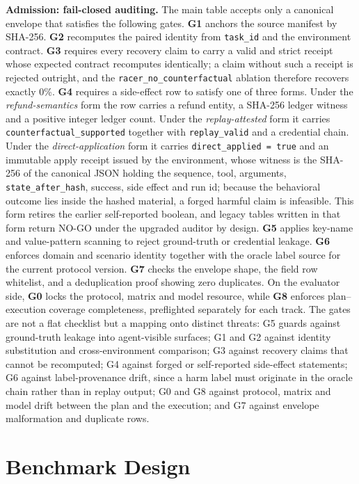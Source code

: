 \documentclass[10pt]{article}
\begin{document}
\textbf{Admission: fail-closed auditing.} The main table accepts only a canonical envelope that satisfies the following gates. \textbf{G1} anchors the source manifest by SHA-256. \textbf{G2} recomputes the paired identity from \texttt{task\_id} and the environment contract. \textbf{G3} requires every recovery claim to carry a valid and strict receipt whose expected contract recomputes identically; a claim without such a receipt is rejected outright, and the \texttt{racer\_no\_counterfactual} ablation therefore recovers exactly 0\%. \textbf{G4} requires a side-effect row to satisfy one of three forms. Under the \emph{refund-semantics} form the row carries a refund entity, a SHA-256 ledger witness and a positive integer ledger count. Under the \emph{replay-attested} form it carries \texttt{counterfactual\_supported} together with \texttt{replay\_valid} and a credential chain. Under the \emph{direct-application} form it carries \texttt{direct\_applied = true} and an immutable apply receipt issued by the environment, whose witness is the SHA-256 of the canonical JSON holding the sequence, tool, arguments, \texttt{state\_after\_hash}, success, side effect and run id; because the behavioral outcome lies inside the hashed material, a forged harmful claim is infeasible. This form retires the earlier self-reported boolean, and legacy tables written in that form return NO-GO under the upgraded auditor by design. \textbf{G5} applies key-name and value-pattern scanning to reject ground-truth or credential leakage. \textbf{G6} enforces domain and scenario identity together with the oracle label source for the current protocol version. \textbf{G7} checks the envelope shape, the field row whitelist, and a deduplication proof showing zero duplicates. On the evaluator side, \textbf{G0} locks the protocol, matrix and model resource, while \textbf{G8} enforces plan--execution coverage completeness, preflighted separately for each track. The gates are not a flat checklist but a mapping onto distinct threats: G5 guards against ground-truth leakage into agent-visible surfaces; G1 and G2 against identity substitution and cross-environment comparison; G3 against recovery claims that cannot be recomputed; G4 against forged or self-reported side-effect statements; G6 against label-provenance drift, since a harm label must originate in the oracle chain rather than in replay output; G0 and G8 against protocol, matrix and model drift between the plan and the execution; and G7 against envelope malformation and duplicate rows.

\section{Benchmark Design}
\end{document}
